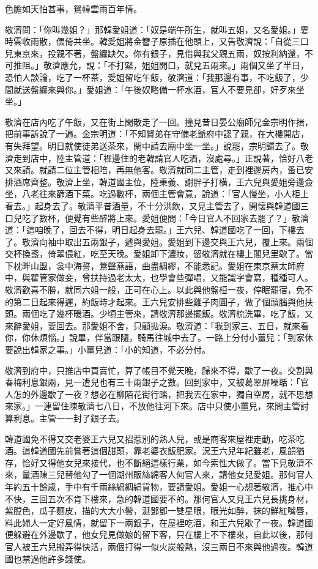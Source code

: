 色膽如天怕甚事，鴛幃雲雨百年情。

敬濟問：「你叫幾姐？」那韓愛姐道：「奴是端午所生，就叫五姐，又名愛姐。」霎時雲收雨散，偎倚共坐。韓愛姐將金簪子原插在他頭上，又告敬濟說：「自從三口兒東京來，投親不著，盤纏缺欠。你有銀子，見借與我父親五兩，奴按利納還，不可推阻。」敬濟應允，說：「不打緊，姐姐開口，就兌五兩來。」兩個又坐了半日，恐怕人談論，吃了一杯茶，愛姐留吃午飯，敬濟道：「我那邊有事，不吃飯了，少間就送盤纏來與你。」愛姐道：「午後奴略備一杯水酒，官人不要見卻，好歹來坐坐。」

敬濟在店內吃了午飯，又在街上閑散走了一回。撞見昔日晏公廟師兄金宗明作揖，把前事訴說了一遍。金宗明道：「不知賢弟在守備老爺府中認了親，在大樓開店，有失拜望。明日就使徒弟送茶來，閑中請去廟中坐一坐。」說罷，宗明歸去了。敬濟走到店中，陸主管道：「裡邊住的老韓請官人吃酒，沒處尋。」正說著，恰好八老又來請。就請二位主管相陪，再無他客。敬濟就同二主管，走到裡邊房內，蚤已安排酒席齊整。敬濟上坐，韓道國主位，陸秉義、謝胖子打橫，王六兒與愛姐旁邊僉坐，八老往來篩酒下菜。吃過數杯，兩個主管會意，說道：「官人慢坐，小人柜上看去。」起身去了。敬濟平昔酒量，不十分洪飲，又見主管去了，開懷與韓道國三口兒吃了數杯，便覺有些醉將上來。愛姐便問：「今日官人不回家去罷了？」敬濟道：「這咱晚了，回去不得，明日起身去罷。」王六兒、韓道國吃了一回，下樓去了。敬濟向袖中取出五兩銀子，遞與愛姐。愛姐到下邊交與王六兒，覆上來。兩個交杯換盞，倚翠偎紅，吃至天晚。愛姐卸下濃妝，留敬濟就在樓上閣兒里歇了。當下枕畔山盟，衾中海誓，鶯聲燕語，曲盡綢繆，不能悉記。愛姐在東京蔡太師府中，與翟管家做妾，曾扶持過老太太，也學會些彈唱，又能識字會寫，種種可人。敬濟歡喜不勝，就同六姐一般，正可在心上。以此與他盤桓一夜，停眠罷宿，免不的第二日起來得遲，約飯時才起來。王六兒安排些雞子肉圓子，做了個頭腦與他扶頭。兩個吃了幾杯暖酒。少頃主管來，請敬濟那邊擺飯。敬濟梳洗畢，吃了飯，又來辭愛姐，要回去。那愛姐不舍，只顧拋淚。敬濟道：「我到家三、五日，就來看你，你休煩惱。」說畢，伴當跟隨，騎馬往城中去了。一路上分付小薑兒：「到家休要說出韓家之事。」小薑兒道：「小的知道，不必分付。

敬濟到府中，只推店中買賣忙，算了帳目不覺天晚，歸來不得，歇了一夜。交割與春梅利息銀兩，見一遭兒也有三十兩銀子之數。回到家中，又被葛翠屏噪聒：「官人怎的外邊歇了一夜？想必在柳陌花街行踏，把我丟在家中，獨自空房，就不思想來家。」一連留住陳敬濟七八日，不放他往河下來。店中只使小薑兒，來問主管討算利息。主管一一封了銀子去。

韓道國免不得又交老婆王六兒又招惹別的熟人兒，或是商客來屋裡走動，吃茶吃酒。這韓道國先前嘗著這個甜頭，靠老婆衣飯肥家。況王六兒年紀雖老，風韻猶存，恰好又得他女兒來接代，也不斷絕這樣行業，如今索性大做了。當下見敬濟不來，量酒陳三兒替他勾了一個湖州販絲綿客人何官人來，請他女兒愛姐。那何官人年約五十餘歲，手中有千兩絲綿綢絹貨物，要請愛姐。愛姐一心想著敬濟，推心中不快，三回五次不肯下樓來，急的韓道國要不的。那何官人又見王六兒長挑身材，紫膛色，瓜子麵皮，描的大大小鬢，涎鄧鄧一雙星眼，眼光如醉，抹的鮮紅嘴唇，料此婦人一定好風情，就留下一兩銀子，在屋裡吃酒，和王六兒歇了一夜。韓道國便躲避在外邊歇了，他女兒見做娘的留下客，只在樓上不下樓來，自此以後，那何官人被王六兒搬弄得快活，兩個打得一似火炭般熱，沒三兩日不來與他過夜。韓道國也禁過他許多錢使。

